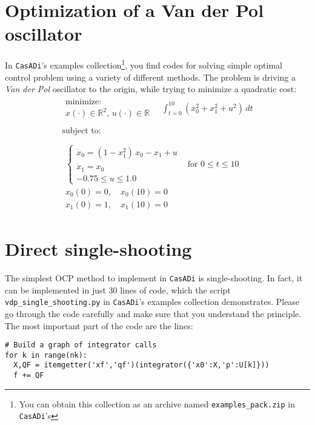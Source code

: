 \documentclass[a4paper,12pt]{book}
\newcommand{\CasADi}{\texttt{CasADi}\xspace}
\begin{document}
\section{Optimization of a Van der Pol oscillator}
In \CasADi's examples collection\footnote{You can obtain this collection as an archive named \texttt{examples\_pack.zip} in \CasADi's }, you find codes for solving simple optimal control problem using a variety of different methods. The problem is driving a \emph{Van der Pol} oscillator to the origin, while trying to minimize a quadratic cost:
\begin{equation}
\begin{array}{lc}
\begin{array}{l}
\text{minimize:} \\
x(\cdot) \in \mathbb{R}^2, \, u(\cdot) \in \mathbb{R}
\end{array}
\quad \displaystyle \int_{t=0}^{10}{(x_0^2 + x_1^2 + u^2) \, dt}
\\
\\
\text{subject to:} \\
\\
\begin{array}{ll}
\left\{
\begin{array}{l}
\dot{x}_0 = (1-x_1^2) \, x_0 - x_1 + u \\
\dot{x}_1 = x_0 \\
-0.75 \le u \le 1.0
\end{array} \right. & \text{for $0 \le t \le 10$} \\
x_0(0)=0, \quad x_0(10)=0  \\
x_1(0)=1, \quad x_1(10)=0
\end{array}
\end{array}
\label{eq:vdp}
\end{equation}

\section{Direct single-shooting}
The simplest OCP method to implement in \CasADi is single-shooting. In fact, it can be implemented in just 30 lines of code, which the script {\texttt{vdp\_single\_shooting.py}} in \CasADi's examples collection demonstrates. Please go through the code carefully and make sure that you understand the principle. The most important part of the code are the lines:
\begin{verbatim}
# Build a graph of integrator calls
for k in range(nk):
  X,QF = itemgetter('xf','qf')(integrator({'x0':X,'p':U[k]}))
  f += QF
\end{verbatim}
\end{document}
